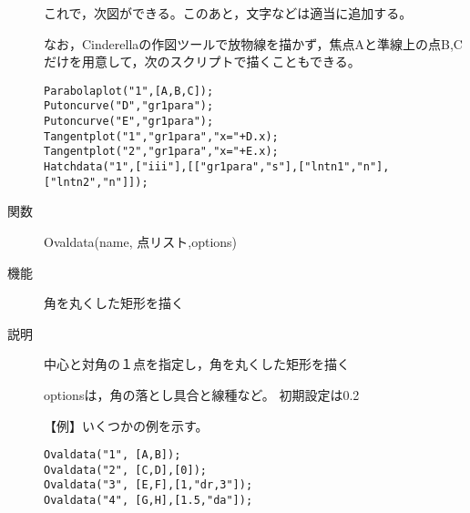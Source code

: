 \documentclass[papersize,a4paper,10pt,uplatex]{jsarticle}
\begin{document}
\begin{description}
これで，次図ができる。このあと，文字などは適当に追加する。
 
\vspace{\baselineskip}
\begin{center} \end{center}

なお，Cinderellaの作図ツールで放物線を描かず，焦点Aと準線上の点B,Cだけを用意して，次のスクリプトで描くこともできる。
\begin{verbatim}
Parabolaplot("1",[A,B,C]);
Putoncurve("D","gr1para");
Putoncurve("E","gr1para");
Tangentplot("1","gr1para","x="+D.x);
Tangentplot("2","gr1para","x="+E.x);
Hatchdata("1",["iii"],[["gr1para","s"],["lntn1","n"],["lntn2","n"]]);
\end{verbatim}


\hypertarget{ovaldata}{}
\item[関数]Ovaldata(name, 点リスト,options)
\item[機能]角を丸くした矩形を描く
\item[説明]中心と対角の１点を指定し，角を丸くした矩形を描く

optionsは，角の落とし具合と線種など。 初期設定は0.2 

\vspace{\baselineskip}
【例】いくつかの例を示す。
\begin{verbatim}
Ovaldata("1", [A,B]);
Ovaldata("2", [C,D],[0]);
Ovaldata("3", [E,F],[1,"dr,3"]);
Ovaldata("4", [G,H],[1.5,"da"]);
\end{verbatim}
\begin{center} \scalebox{0.9}{}\end{center}

\end{description}
\end{document}

